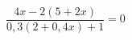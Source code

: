 \begin{ex}[type=equation]
	\begin{condition}
		 $\dfrac{4x - 2(5+2x)}{0,3(2+0,4 x)+1} = 0$
	\end{condition}
	\answer{$\varnothing$}
\end{ex}